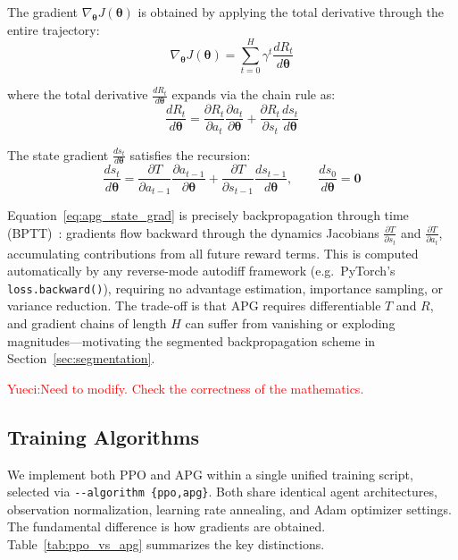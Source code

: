 \documentclass[11pt,a4paper]{article}
\newcommand{\btheta}{\bm{\theta}}
\newcommand{\yueci}[1]
{\textcolor{red}{Yueci:{#1}}}
\begin{document}
The gradient $\nabla_{\btheta} J(\btheta)$ is obtained by applying the total derivative through the entire trajectory:
\begin{equation}
  \nabla_{\btheta} J(\btheta) = \sum_{t=0}^{H} \gamma^t \frac{d R_t}{d \btheta}
  \label{eq:apg_grad}
\end{equation}

where the total derivative $\tfrac{d R_t}{d \btheta}$ expands via the chain rule as:
\begin{equation}
  \frac{d R_t}{d \btheta}
  = \frac{\partial R_t}{\partial a_t}\frac{\partial a_t}{\partial \btheta}
  + \frac{\partial R_t}{\partial s_t}\frac{d s_t}{d \btheta}
  \label{eq:apg_chain}
\end{equation}

The state gradient $\tfrac{d s_t}{d \btheta}$ satisfies the recursion:
\begin{equation}
  \frac{d s_t}{d \btheta}
  = \frac{\partial T}{\partial a_{t-1}}\frac{\partial a_{t-1}}{\partial \btheta}
  + \frac{\partial T}{\partial s_{t-1}}\frac{d s_{t-1}}{d \btheta}, \qquad \frac{d s_0}{d \btheta} = \mathbf{0}
  \label{eq:apg_state_grad}
\end{equation}

Equation~\eqref{eq:apg_state_grad} is precisely backpropagation through time (BPTT)~\cite{werbos1990bptt}: gradients flow backward through the dynamics Jacobians $\tfrac{\partial T}{\partial s_t}$ and $\tfrac{\partial T}{\partial a_t}$, accumulating contributions from all future reward terms. This is computed automatically by any reverse-mode autodiff framework (e.g.\ PyTorch's \texttt{loss.backward()}), requiring no advantage estimation, importance sampling, or variance reduction. The trade-off is that APG requires differentiable $T$ and $R$, and gradient chains of length $H$ can suffer from vanishing or exploding magnitudes—motivating the segmented backpropagation scheme in Section~\ref{sec:segmentation}.

\yueci{Need to modify. Check the correctness of the mathematics.}

\subsection{Training Algorithms}
\label{sec:training_algorithms}

We implement both PPO and APG within a single unified training script, selected via \texttt{-{}-algorithm \{ppo,apg\}}. Both share identical agent architectures, observation normalization, learning rate annealing, and Adam optimizer settings. The fundamental difference is how gradients are obtained. Table~\ref{tab:ppo_vs_apg} summarizes the key distinctions.
\end{document}
